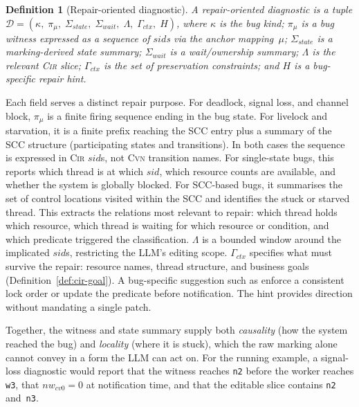 \documentclass[sigconf]{acmart}
\newtheorem{definition}{Definition}
\begin{document}
\begin{definition}[Repair-oriented diagnostic]
\label{def:diagnostic}
A repair-oriented diagnostic is a tuple
$\mathcal{D}=(\kappa,\;\pi_{\mu},\;\Sigma_{\mathit{state}},\;
  \Sigma_{\mathit{wait}},\;\Lambda,\;\Gamma_{\mathit{ctx}},\;H)$,
where
$\kappa$ is the bug kind;
$\pi_{\mu}$ is a bug witness expressed as a sequence of
$\mathit{sid}$s via the anchor mapping~$\mu$;
$\Sigma_{\mathit{state}}$ is a marking-derived state summary;
$\Sigma_{\mathit{wait}}$ is a wait/ownership summary;
$\Lambda$ is the relevant \textsc{Cir} slice;
$\Gamma_{\mathit{ctx}}$ is the set of preservation constraints;
and $H$ is a bug-specific repair hint.
\end{definition}

Each field serves a distinct repair purpose.
For deadlock, signal loss, and channel block, $\pi_{\mu}$ is a finite firing sequence ending in the bug state. For livelock and starvation, it is a finite prefix reaching the SCC entry plus a summary of the SCC structure (participating states and transitions). In both cases the sequence is expressed in \textsc{Cir} $\mathit{sid}$s, not \textsc{Cvn} transition names. For single-state bugs, this reports which thread is at which $\mathit{sid}$, which resource counts are available, and whether
the system is globally blocked. For SCC-based bugs, it summarises the set of control locations visited within the SCC and identifies the stuck or starved thread. This extracts the relations most relevant to repair: which thread holds which resource, which thread is waiting for which resource or condition, and which predicate triggered the classification. $\Lambda$ is a bounded window around the implicated $\mathit{sid}$s, restricting the LLM's editing scope. $\Gamma_{\mathit{ctx}}$ specifies what must survive the repair: resource names, thread structure, and business goals (Definition~\ref{def:cir-goal}). A bug-specific suggestion such as enforce a consistent lock order or update the predicate before notification. The hint provides direction without mandating a single patch.

\medskip
\noindent
Together, the witness and state summary supply both \emph{causality} (how the system reached the bug) and \emph{locality} (where it is stuck), which the raw marking alone cannot convey in a form the LLM can act on.
For the running example, a signal-loss diagnostic would report that the witness reaches \texttt{n2} before the worker reaches \texttt{w3}, that $nw_{\mathit{cv0}}=0$ at notification time, and that the editable slice contains \texttt{n2} and~\texttt{n3}.
\end{document}
